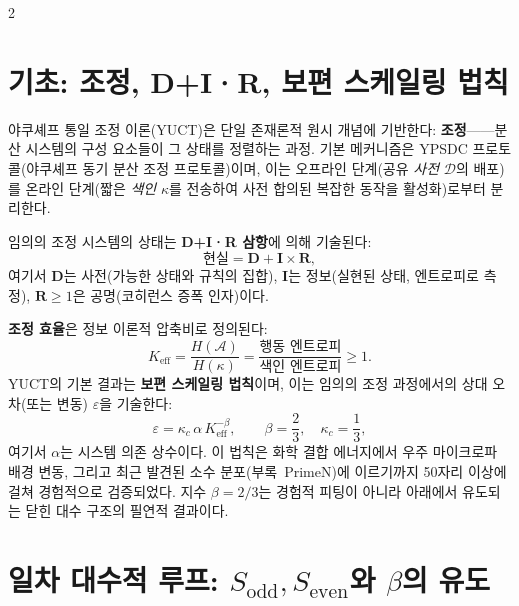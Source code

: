 \documentclass[12pt,a4paper]{article}
\newcommand{\Keff}{K_{\mathrm{eff}}}
\newcommand{\kappac}{\kappa_c}
\begin{document}
	\begin{multicols}{2}
		
		\section{기초: 조정, D+I·R, 보편 스케일링 법칙}
		
		야쿠셰프 통일 조정 이론(YUCT)은 단일 존재론적 원시 개념에 기반한다: \textbf{조정}——분산 시스템의 구성 요소들이 그 상태를 정렬하는 과정. 기본 메커니즘은 YPSDC 프로토콜(야쿠셰프 동기 분산 조정 프로토콜)이며, 이는 오프라인 단계(공유 \textit{사전} \(\mathcal{D}\)의 배포)를 온라인 단계(짧은 \textit{색인} \(\kappa\)를 전송하여 사전 합의된 복잡한 동작을 활성화)로부터 분리한다.
		
		임의의 조정 시스템의 상태는 \textbf{D+I·R 삼항}에 의해 기술된다:
		\[
		\text{현실} = \mathbf{D} + \mathbf{I} \times \mathbf{R},
		\]
		여기서 \(\mathbf{D}\)는 사전(가능한 상태와 규칙의 집합), \(\mathbf{I}\)는 정보(실현된 상태, 엔트로피로 측정), \(\mathbf{R} \ge 1\)은 공명(코히런스 증폭 인자)이다.
		
		\textbf{조정 효율}은 정보 이론적 압축비로 정의된다:
		\[
		\Keff = \frac{H(\mathcal{A})}{H(\kappa)} = \frac{\text{행동 엔트로피}}{\text{색인 엔트로피}} \ge 1.
		\]
		YUCT의 기본 결과는 \textbf{보편 스케일링 법칙}이며, 이는 임의의 조정 과정에서의 상대 오차(또는 변동) \(\varepsilon\)을 기술한다:
		\[
		\boxed{\varepsilon = \kappac \, \alpha \, \Keff^{-\beta}, \qquad \beta = \frac{2}{3}, \quad \kappac = \frac{1}{3}},
		\]
		여기서 \(\alpha\)는 시스템 의존 상수이다. 이 법칙은 화학 결합 에너지에서 우주 마이크로파 배경 변동, 그리고 최근 발견된 소수 분포(부록~PrimeN)에 이르기까지 50자리 이상에 걸쳐 경험적으로 검증되었다. 지수 \(\beta = 2/3\)는 경험적 피팅이 아니라 아래에서 유도되는 닫힌 대수 구조의 필연적 결과이다.
		
		\section{일차 대수적 루프: \(S_{\mathrm{odd}}, S_{\mathrm{even}}\)와 \(\beta\)의 유도}
		

\end{multicols}
\end{document}
